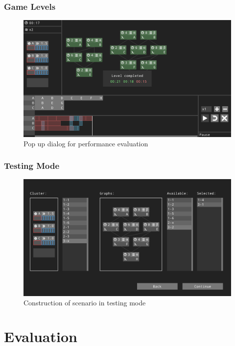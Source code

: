 \documentclass[msc,deptreport, cs]{infthesis}
\begin{document}
\subsection{Game Levels}

\begin{figure}[!htb]
  \centering
  \includegraphics[width=\columnwidth]{play6.png}
  \caption{Pop up dialog for performance evaluation}
  \label{fig:container}
\end{figure}

\subsection{Testing Mode}

\begin{figure}[!htb]
  \centering
  \includegraphics[width=\columnwidth]{play3.png}
  \caption{Construction of scenario in testing mode}
  \label{fig:container}
\end{figure}


\chapter{Evaluation}
\end{document}

